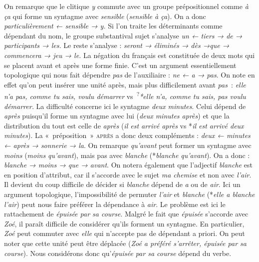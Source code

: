 {    
    \begin{exe}
     On remarque que le clitique \textit{y} commute avec un groupe prépositionnel comme \textit{à ça} qui forme un syntagme avec \textit{sensible} (\textit{sensible à ça}). On a donc \textit{particulièrement ← sensible → y.}
     Si l’on traite les déterminants comme dépendant du nom, le groupe substantival sujet s’analyse \textit{un ← tiers → de → participants → les.} Le reste s’analyse : \textit{seront → éliminés → dès →que → commencera → jeu → le.}
     La négation du français est constituée de deux mots qui se placent avant et après une forme finie. C’est un argument essentiellement topologique qui nous fait dépendre \textit{pas} de l’auxiliaire : \textit{ne ← a → pas}. On note en effet qu’on peut insérer une unité après, mais plus difficilement avant \textit{pas~}: \textit{elle n’a pas, comme tu sais, voulu démarrer} vs~\textsuperscript{?}\textit{*elle n’a, comme tu sais, pas voulu démarrer.}
     La difficulté concerne ici le syntagme \textit{deux minutes}. Celui dépend de \textit{après} puisqu’il forme un syntagme avec lui (\textit{deux minutes après}) et que la distribution du tout est celle de \textit{après} (\textit{il est arrivé après} vs *\textit{il est arrivé deux minutes}). La «~préposition~» \textsc{après} a donc deux compléments : \textit{deux ← minutes ← après → sonnerie → la}.
     On remarque \textit{qu’avant} peut former un syntagme avec \textit{moins} (\textit{moins qu’avant}), mais pas avec \textit{blanche} (*\textit{blanche qu’avant}). On a donc : \textit{blanche → moins → que → avant}. On notera également que l’adjectif \textit{blanche} est en position d’attribut, car il s’accorde avec le sujet \textit{ma chemise} et non avec \textit{l’air}. Il devient du coup difficile de décider si \textit{blanche} dépend de \textit{a} ou de \textit{air}. Ici un argument topologique, l’impossibilité de permuter \textit{l’air} et \textit{blanche} (*\textit{elle a blanche l’air}) peut nous faire préférer la dépendance à \textit{air}.
     Le problème est ici le rattachement de \textit{épuisée par sa course}. Malgré le fait que \textit{épuisée} s’accorde avec \textit{Zoé}, il paraît difficile de considérer qu’ils forment un syntagme. En particulier, \textit{Zoé} peut commuter avec \textit{elle} qui n’accepte pas de dépendant a priori. On peut noter que cette unité peut être déplacée (\textit{Zoé a préféré s’arrêter, épuisée par sa course}). Nous considérons donc qu’\textit{épuisée par sa course} dépend du verbe.

\end{exe}}
